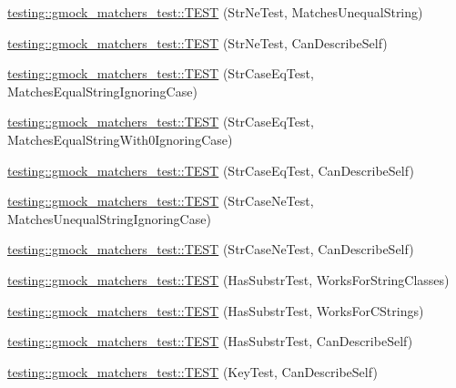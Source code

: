 \begin{DoxyCompactItemize}
\item 
\mbox{\hyperlink{namespacetesting_1_1gmock__matchers__test_a3c0a0ca54e3d34c55bd30c2b5572d902}{testing\+::gmock\+\_\+matchers\+\_\+test\+::\+T\+E\+ST}} (Str\+Ne\+Test, Matches\+Unequal\+String)
\item 
\mbox{\hyperlink{namespacetesting_1_1gmock__matchers__test_a4daef0c28c6b07cb3d6a6306c05599b0}{testing\+::gmock\+\_\+matchers\+\_\+test\+::\+T\+E\+ST}} (Str\+Ne\+Test, Can\+Describe\+Self)
\item 
\mbox{\hyperlink{namespacetesting_1_1gmock__matchers__test_ae0c0b82b3895923747dc70cb9339a8dc}{testing\+::gmock\+\_\+matchers\+\_\+test\+::\+T\+E\+ST}} (Str\+Case\+Eq\+Test, Matches\+Equal\+String\+Ignoring\+Case)
\item 
\mbox{\hyperlink{namespacetesting_1_1gmock__matchers__test_aa159c9a52c6dc18cb7f214fbb5bddece}{testing\+::gmock\+\_\+matchers\+\_\+test\+::\+T\+E\+ST}} (Str\+Case\+Eq\+Test, Matches\+Equal\+String\+With0\+Ignoring\+Case)
\item 
\mbox{\hyperlink{namespacetesting_1_1gmock__matchers__test_ab4fb6542ea3a7789850668a9266a80ef}{testing\+::gmock\+\_\+matchers\+\_\+test\+::\+T\+E\+ST}} (Str\+Case\+Eq\+Test, Can\+Describe\+Self)
\item 
\mbox{\hyperlink{namespacetesting_1_1gmock__matchers__test_a9a627f8538cfff62fbaee86ac465f6c8}{testing\+::gmock\+\_\+matchers\+\_\+test\+::\+T\+E\+ST}} (Str\+Case\+Ne\+Test, Matches\+Unequal\+String\+Ignoring\+Case)
\item 
\mbox{\hyperlink{namespacetesting_1_1gmock__matchers__test_ae953891c7961b6ffd51dc712be8d24de}{testing\+::gmock\+\_\+matchers\+\_\+test\+::\+T\+E\+ST}} (Str\+Case\+Ne\+Test, Can\+Describe\+Self)
\item 
\mbox{\hyperlink{namespacetesting_1_1gmock__matchers__test_a2a1043a0b8bfb4bc0b5fb539317132a3}{testing\+::gmock\+\_\+matchers\+\_\+test\+::\+T\+E\+ST}} (Has\+Substr\+Test, Works\+For\+String\+Classes)
\item 
\mbox{\hyperlink{namespacetesting_1_1gmock__matchers__test_a147dde340ba8f77308cd116d3bb831d6}{testing\+::gmock\+\_\+matchers\+\_\+test\+::\+T\+E\+ST}} (Has\+Substr\+Test, Works\+For\+C\+Strings)
\item 
\mbox{\hyperlink{namespacetesting_1_1gmock__matchers__test_ae47e8ad8f8a4a33ac08b596eb839380e}{testing\+::gmock\+\_\+matchers\+\_\+test\+::\+T\+E\+ST}} (Has\+Substr\+Test, Can\+Describe\+Self)
\item 
\mbox{\hyperlink{namespacetesting_1_1gmock__matchers__test_acdbdca45a537261fd168cdb8df9348d7}{testing\+::gmock\+\_\+matchers\+\_\+test\+::\+T\+E\+ST}} (Key\+Test, Can\+Describe\+Self)

\end{DoxyCompactItemize}
